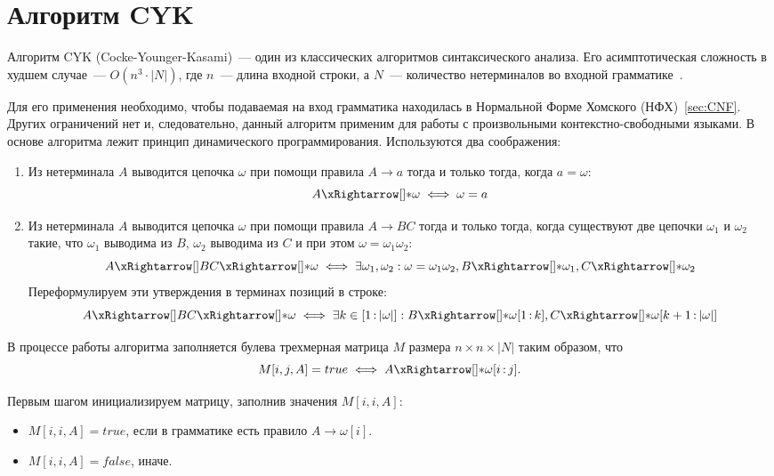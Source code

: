 \section{Алгоритм CYK}
\label{sec:lin_CYK}

Алгоритм CYK (Cocke-Younger-Kasami)~--- один из классических алгоритмов синтаксического анализа.
Его асимптотическая сложность в худшем случае~--- $O(n^3 \cdot |N|)$, где $n$~--- длина входной строки, а $N$~--- количество нетерминалов во входной грамматике~.

Для его применения необходимо, чтобы подаваемая на вход грамматика находилась в Нормальной Форме Хомского (НФХ)~\ref{sec:CNF}.
Других ограничений нет и, следовательно, данный алгоритм применим для работы с произвольными контекстно-свободными языками.
В основе алгоритма лежит принцип динамического программирования.
Используются два соображения:
\begin{enumerate}
    \item Из нетерминала $A$ выводится цепочка $\omega$ при помощи правила $A \to a$ тогда и только тогда, когда $a = \omega$:
          \[ A \derives \omega \iff \omega = a \]
    \item Из нетерминала $A$ выводится цепочка $\omega$ при помощи правила $A \to B C$ тогда и только тогда, когда существуют две цепочки $\omega_1$ и $\omega_2$ такие, что $\omega_1$ выводима из $B$, $\omega_2$ выводима из $C$ и при этом $\omega = \omega_1 \omega_2$:
          \[ A \derives[] B C \derives \omega \iff \exists \omega_1, \omega_2 : \omega = \omega_1 \omega_2, B \derives \omega_1, C \derives \omega_2 \]
          Переформулируем эти утверждения в терминах позиций в строке:
          \[ A \derives[] B C \derives \omega \iff \exists k \in [1 \rng |\omega|] : B \derives \omega[1 \rng k], C \derives \omega[k+1 \rng |\omega|] \]
\end{enumerate}

В процессе работы алгоритма заполняется булева трехмерная матрица $M$ размера $n \times n \times  |N|$ таким образом, что
\[ M[i, j, A] = true \iff A \derives \omega[i \rng j]. \]

Первым шагом инициализируем матрицу, заполнив значения $M[i, i, A]$:
\begin{itemize}
    \item $M[i, i, A] = true$, если в грамматике есть правило $A \to \omega[i]$.
    \item $M[i, i, A] = false$, иначе.
\end{itemize}

